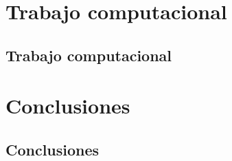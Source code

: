 \documentclass[12pt,t]{beamer}
\begin{document}

\section{Trabajo computacional}
\subsection{Trabajo computacional}

\begin{frame}
 
\end{frame}


\section{Conclusiones}
\subsection{Conclusiones}

\begin{frame}
 
\end{frame}


\maketitle

\end{document}
